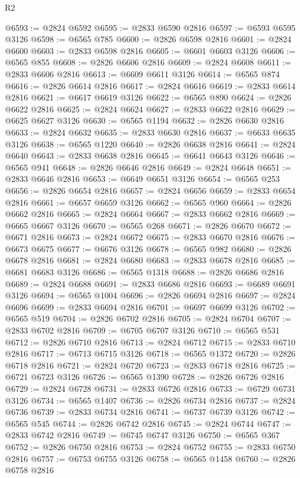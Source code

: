 \begin{lexlean}{R2}
\begin{coremodule}
@6593 := @2824 @6592
@6595 := @2833 @6590 @2816
@6597 := @6593 @6595 @3126
@6598 := @6565 @785
@6600 := @2826 @6598 @2816
@6601 := @2824 @6600
@6603 := @2833 @6598 @2816
@6605 := @6601 @6603 @3126
@6606 := @6565 @855
@6608 := @2826 @6606 @2816
@6609 := @2824 @6608
@6611 := @2833 @6606 @2816
@6613 := @6609 @6611 @3126
@6614 := @6565 @874
@6616 := @2826 @6614 @2816
@6617 := @2824 @6616
@6619 := @2833 @6614 @2816
@6621 := @6617 @6619 @3126
@6622 := @6565 @890
@6624 := @2826 @6622 @2816
@6625 := @2824 @6624
@6627 := @2833 @6622 @2816
@6629 := @6625 @6627 @3126
@6630 := @6565 @1194
@6632 := @2826 @6630 @2816
@6633 := @2824 @6632
@6635 := @2833 @6630 @2816
@6637 := @6633 @6635 @3126
@6638 := @6565 @1220
@6640 := @2826 @6638 @2816
@6641 := @2824 @6640
@6643 := @2833 @6638 @2816
@6645 := @6641 @6643 @3126
@6646 := @6565 @941
@6648 := @2826 @6646 @2816
@6649 := @2824 @6648
@6651 := @2833 @6646 @2816
@6653 := @6649 @6651 @3126
@6654 := @6565 @253
@6656 := @2826 @6654 @2816
@6657 := @2824 @6656
@6659 := @2833 @6654 @2816
@6661 := @6657 @6659 @3126
@6662 := @6565 @960
@6664 := @2826 @6662 @2816
@6665 := @2824 @6664
@6667 := @2833 @6662 @2816
@6669 := @6665 @6667 @3126
@6670 := @6565 @268
@6671 := @2826 @6670
@6672 := @6671 @2816
@6673 := @2824 @6672
@6675 := @2833 @6670 @2816
@6676 := @6673 @6675
@6677 := @6676 @3126
@6678 := @6565 @982
@6680 := @2826 @6678 @2816
@6681 := @2824 @6680
@6683 := @2833 @6678 @2816
@6685 := @6681 @6683 @3126
@6686 := @6565 @1318
@6688 := @2826 @6686 @2816
@6689 := @2824 @6688
@6691 := @2833 @6686 @2816
@6693 := @6689 @6691 @3126
@6694 := @6565 @1004
@6696 := @2826 @6694 @2816
@6697 := @2824 @6696
@6699 := @2833 @6694 @2816
@6701 := @6697 @6699 @3126
@6702 := @6565 @519
@6704 := @2826 @6702 @2816
@6705 := @2824 @6704
@6707 := @2833 @6702 @2816
@6709 := @6705 @6707 @3126
@6710 := @6565 @531
@6712 := @2826 @6710 @2816
@6713 := @2824 @6712
@6715 := @2833 @6710 @2816
@6717 := @6713 @6715 @3126
@6718 := @6565 @1372
@6720 := @2826 @6718 @2816
@6721 := @2824 @6720
@6723 := @2833 @6718 @2816
@6725 := @6721 @6723 @3126
@6726 := @6565 @1390
@6728 := @2826 @6726 @2816
@6729 := @2824 @6728
@6731 := @2833 @6726 @2816
@6733 := @6729 @6731 @3126
@6734 := @6565 @1407
@6736 := @2826 @6734 @2816
@6737 := @2824 @6736
@6739 := @2833 @6734 @2816
@6741 := @6737 @6739 @3126
@6742 := @6565 @545
@6744 := @2826 @6742 @2816
@6745 := @2824 @6744
@6747 := @2833 @6742 @2816
@6749 := @6745 @6747 @3126
@6750 := @6565 @367
@6752 := @2826 @6750 @2816
@6753 := @2824 @6752
@6755 := @2833 @6750 @2816
@6757 := @6753 @6755 @3126
@6758 := @6565 @1458
@6760 := @2826 @6758 @2816

\end{coremodule}
\end{lexlean}
